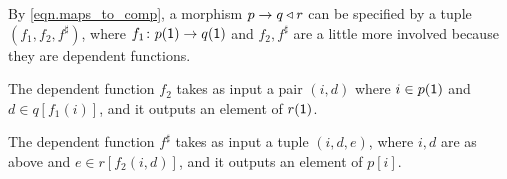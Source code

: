 \documentclass[Book-Poly]{subfiles}
\begin{document}

\begin{example}\label{ex.map_to_comp}
By \eqref{eqn.maps_to_comp}, a morphism $p\to q\mathbin{\triangleleft} r$ can be specified by a tuple $(f_1,f_2,f^\sharp)$, where $f_1\colon p(\textsf{1})\to q(\textsf{1})$ and $f_2,f^\sharp$ are a little more involved because they are dependent functions.

The dependent function $f_2$ takes as input a pair $(i,d)$ where $i\in p(\textsf{1})$ and $d\in q[f_1(i)]$, and it outputs an element of $r(\textsf{1})$.

The dependent function $f^\sharp$ takes as input a tuple $(i,d,e)$, where $i,d$ are as above and $e\in r[f_2(i,d)]$, and it outputs an element of $p[i]$.


\end{example}
\end{document}
